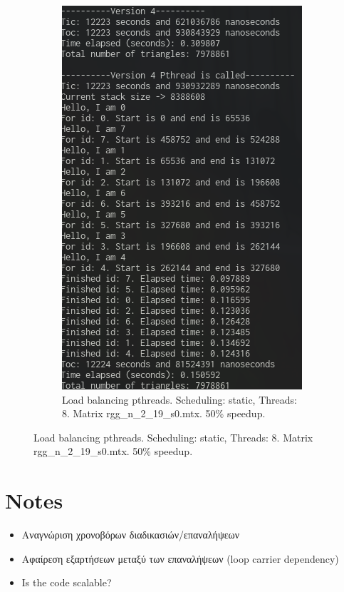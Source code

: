 \documentclass[12pt, a4paper]{article}
\begin{document}
\begin{figure}[h!]
\begin{subfigure}[b]{0.45\textwidth}
         \includegraphics[height=.3\textheight, width=\textwidth, keepaspectratio]{assets/load_pthreads2.png}
         \caption{Load balancing pthreads. Scheduling: static, Threads: 8. Matrix rgg\_n\_2\_19\_s0.mtx. 50\% speedup.}
     \end{subfigure}
\end{figure}


\section{Notes}
\begin{itemize}
    \item Αναγνώριση χρονοβόρων διαδικασιών/επαναλήψεων
    \item Αφαίρεση εξαρτήσεων μεταξύ των επαναλήψεων (loop carrier dependency)
    \item Is the code scalable?
\end{itemize}
\end{document}
